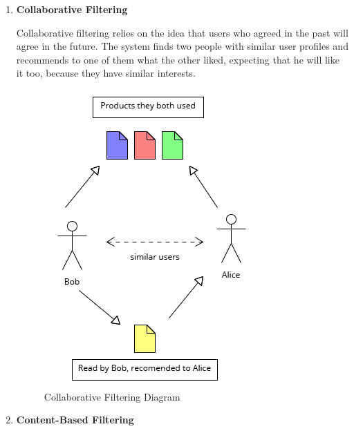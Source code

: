 \documentclass[10pt,twoside,slovak,a4paper]{article}
\begin{document}
\begin{enumerate}
\item  \textbf{Collaborative Filtering}

Collaborative filtering relies on the idea that users who agreed in the past will agree in the future. The system finds two people with similar user profiles and recommends to one of them what the other liked, expecting that he will like it too, because they have similar interests.
\begin{figure}[!h]
    \centering
    \includegraphics[width=0.8\linewidth]{Diagram 3.png}
    \caption{Collaborative Filtering Diagram}
    \label{fig:picture}
\end{figure}

\newpage
\item  \textbf{Content-Based Filtering}


\end{enumerate}
\end{document}

